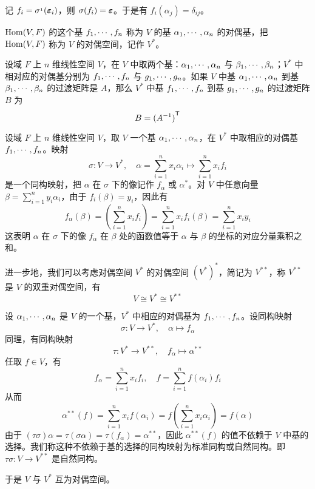 记 $f_i = \sigma^{_1}(\boldsymbol{\varepsilon}_i)$，则 $\sigma(f_i) = \boldsymbol{\varepsilon}$。于是有 $f_i(\alpha_j) = \delta_{ij}$。

$\operatorname{Hom}(V,F)$ 的这个基 $f_1,\cdots,f_n$ 称为 $V$ 的基 $\alpha_1,\cdots,\alpha_n$ 的对偶基，把 $\operatorname{Hom}(V,F)$ 称为 $V$ 的对偶空间，记作 $V^*$。

\begin{theorem}
    设域 $F$ 上 $n$ 维线性空间 $V$，在 $V$ 中取两个基：$\alpha_1,\cdots,\alpha_n$ 与 $\beta_1,\cdots,\beta_n$；$V^*$ 中相对应的对偶基分别为 $f_1,\cdots,f_n$ 与 $g_1,\cdots,g_n$。如果 $V$ 中基 $\alpha_1,\cdots,\alpha_n$ 到基 $\beta_1,\cdots,\beta_n$ 的过渡矩阵是 $A$，那么 $V^*$ 中基 $f_1,\cdots,f_n$ 到基 $g_1,\cdots,g_n$ 的过渡矩阵 $B$ 为
    \[ B = {(A^{-1})}^\mathsf{T} \]
\end{theorem}

设域 $F$ 上 $n$ 维线性空间 $V$，取 $V$ 一个基 $\alpha_1,\cdots,\alpha_n$，在 $V^*$ 中取相应的对偶基 $f_1,\cdots,f_n$。映射
\[ \sigma : V \to V^*, \quad \alpha = \sum_{i=1}^n x_i\alpha_i \mapsto \sum_{i=1}^n x_if_i \]
是一个同构映射，把 $\alpha$ 在 $\sigma$ 下的像记作 $f_\alpha$ 或 $\alpha^*$。对 $V$ 中任意向量 $\beta = \sum_{i=1}^n y_i\alpha_i$，由于 $f_i(\beta) = y_i$，因此有
\[ f_\alpha(\beta) = \left( \sum_{i=1}^n x_if_i \right) = \sum_{i=1}^n x_if_i(\beta) = \sum_{i=1}^n x_iy_i \]
这表明 $\alpha$ 在 $\sigma$ 下的像 $f_\alpha$ 在 $\beta$ 处的函数值等于 $\alpha$ 与 $\beta$ 的坐标的对应分量乘积之和。

进一步地，我们可以考虑对偶空间 $V^*$ 的对偶空间 $(V^*)^*$，简记为 $V^{**}$，称 $V^{**}$ 是 $V$ 的双重对偶空间，有
\[ V \cong V^{*} \cong V^{**} \]

设 $\alpha_1,\cdots,\alpha_n$ 是 $V$ 的一个基，$V^*$ 中相应的对偶基为 $f_1,\cdots,f_n$。设同构映射 
\[ \sigma : V \to V^*, \quad \alpha \mapsto f_\alpha \]
同理，有同构映射
\[ \tau : V^* \to V^{**}, \quad f_\alpha \mapsto \alpha^{**} \]
任取 $f \in V$，有
\[ f_\alpha = \sum_{i=1}^n x_if_i, \quad f = \sum_{i=1}^n f(\alpha_i) f_i \]
从而
\[ \alpha^{**}(f) = \sum_{i=1}^n x_if(\alpha_i) = f\left( \sum_{i=1}^n x_i\alpha_i \right) = f(\alpha) \]
由于  $(\tau\sigma)\alpha = \tau(\sigma\alpha) = \tau(f_\alpha) = \alpha^{**}$，因此 $\alpha^{**}(f)$ 的值不依赖于 $V$ 中基的选择。我们称这种不依赖于基的选择的同构映射为标准同构或自然同构。即 $\tau\sigma : V \to V^{**}$ 是自然同构。

于是 $V$ 与 $V^{*}$ 互为对偶空间。
